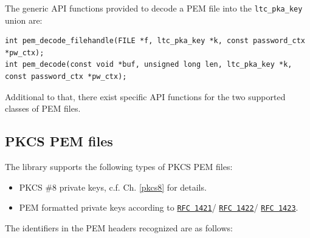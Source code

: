 \documentclass[synpaper]{book}
\begin{document}
The generic API functions provided to decode a PEM file into the \texttt{ltc\_pka\_key} union are:

\begin{verbatim}
int pem_decode_filehandle(FILE *f, ltc_pka_key *k, const password_ctx *pw_ctx);
int pem_decode(const void *buf, unsigned long len, ltc_pka_key *k, const password_ctx *pw_ctx);
\end{verbatim}

Additional to that, there exist specific API functions for the two supported classes of PEM files.

\subsection{PKCS PEM files}

The library supports the following types of PKCS PEM files:

\begin{itemize}
\item PKCS \#8 private keys, c.f. Ch. \ref{pkcs8} for details.
\item PEM formatted private keys according to
\href{https://datatracker.ietf.org/doc/html/rfc1421}{\texttt{RFC 1421}}/
\href{https://datatracker.ietf.org/doc/html/rfc1422}{\texttt{RFC 1422}}/
\href{https://datatracker.ietf.org/doc/html/rfc1423}{\texttt{RFC 1423}}.
\end{itemize}

The identifiers in the PEM headers recognized are as follows:
\end{document}
